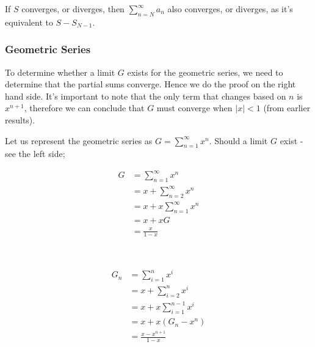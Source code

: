 \documentclass[a4paper, 12pt]{article}
\newcommand{\summation}[3]{\sum\limits_{#1}^{#2} #3}
\begin{document}
            If $S$ converges, or diverges, then $\summation{n = N}{\infty}{a_n}$ also converges, or diverges, as it's equivalent to $S - S_{N - 1}$.
            \smallskip

            \subsubsection*{Geometric Series}
                To determine whether a limit $G$ exists for the geometric series, we need to determine that the partial sums converge. Hence we do the proof on the right hand side. It's important to note that the only term that changes based on $n$ is $x^{n + 1}$, therefore we can conclude that $G$ must converge when $|x| < 1$ (from earlier results).
                \smallskip

                Let us represent the geometric series as $G = \summation{n = 1}{\infty}{x^n}$. Should a limit $G$ exist - see the left side;
                \begin{center}
                    \vspace{-\baselineskip}
                    \begin{minipage}{0.485\textwidth}
                        \begin{align*}
                            G & = \summation{n = 1}{\infty}{x^n} \\
                            & = x + \summation{n = 2}{\infty}{x^n} \\
                            & = x + x\summation{n = 1}{\infty}{x^n} \\
                            & = x + xG \\
                            & = \frac{x}{1 - x}
                        \end{align*}
                    \end{minipage} \
                    \begin{minipage}{0.485\textwidth}
                        \begin{align*}
                            G_n & = \summation{i = 1}{n}{x^i} \\
                            & = x + \summation{i = 2}{n}{x^i} \\
                            & = x + x\summation{i = 1}{n - 1}{x^i} \\
                            & = x + x(G_n - x^n) \\
                            & = \frac{x - x^{n + 1}}{1 - x}
                        \end{align*}
                    \end{minipage}
                \end{center}
\end{document}
